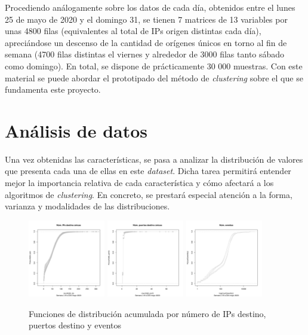 Procediendo análogamente sobre los datos de cada día, obtenidos entre el lunes 25 de mayo de 2020 y el domingo 31,
se tienen 7 matrices de 13 variables por unas 4800 filas (equivalentes al total de IPs origen distintas cada día),
apreciándose un descenso de la cantidad de orígenes únicos en torno al fin de semana
(4700 filas distintas el viernes y alrededor de 3000 filas tanto sábado como domingo).
En total, se dispone de prácticamente 30 000 muestras.
Con este material se puede abordar el prototipado del método de \emph{clustering} sobre el que se fundamenta este proyecto.

\section{Análisis de datos}\label{sec:analisisdedatos}

Una vez obtenidas las características, se pasa a analizar la distribución de valores que presenta cada una de ellas en este \emph{dataset}.
Dicha tarea permitirá entender mejor la importancia relativa de cada característica y cómo afectará a los algoritmos de \emph{clustering}.
En concreto, se prestará especial atención a la forma, varianza y modalidades de las distribuciones.

\begin{figure}[h]
    \centering
    \includegraphics[width=0.3\textwidth]{contenido/fig/ecdf-count_dst_ip.pdf}
    \includegraphics[width=0.3\textwidth]{contenido/fig/ecdf-count_dst_port.pdf}
    \includegraphics[width=0.3\textwidth]{contenido/fig/ecdf-count_events.pdf}
    \caption{Funciones de distribución acumulada por número de IPs destino, puertos destino y eventos}
    \label{fig:ecdfcountdstip}
\end{figure}

